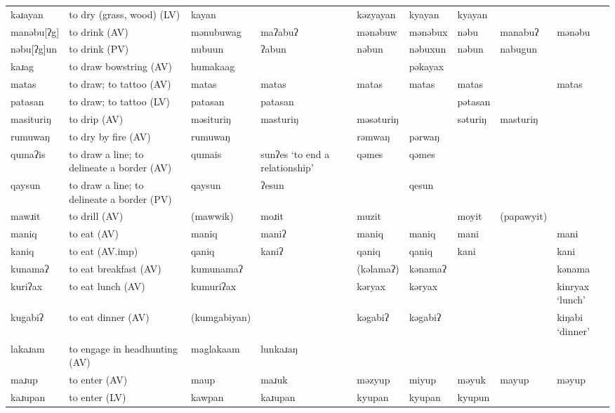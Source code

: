 \begin{landscape}
\begin{longtable}{*{9}{>{\raggedright\arraybackslash}p{}}}
\text{*}kəɹayan      & to dry (grass, wood) (LV) & kayan &  & kəzyayan & kyayan & kyayan &  & \\
\text{*}manəbu[ʔg]   & to drink (AV) & mənubuwag & maʔabuʔ & mənəbuw & mənəbux & nəbu & manabuʔ & mənəbu\\
\text{*}nəbu[ʔg]un   & to drink (PV) & nubuun & ʔabun & nəbun & nəbuxun & nəbun & nabugun & \\
\text{*}kaɹag       & to draw bowstring (AV) & humakaag &  &  & pəkayax &  &  & \\
\text{*}matas        & to draw; to tattoo (AV) & matas & matas & matas & matas & matas &  & matas\\
\text{*}patasan      & to draw; to tattoo (LV) & patasan & patasan &  &  & pətasan &  & \\
\text{*}masituriŋ    & to drip (AV) & məsituriŋ & masturiŋ & məsəturiŋ &  & səturiŋ & masturiŋ & \\
\text{*}rumuwaŋ      & to dry by fire (AV) & rumuwaŋ &  & rəmwaŋ & pərwaŋ &  &  & \\
\text{*}qumaʔis      & to draw a line; to delineate a border (AV) & qumais & sunʔes \newline `to end a relationship' & qəmes & qəmes &  &  & \\
\text{*}qaysun       & to draw a line; to delineate a border (PV) & qaysun & ʔesun &  & qesun &  &  & \\
\text{*}mawɹit       & to drill (AV) & (mawwik) & moɹit & muzit &  & moyit & (papawyit) & \\
\text{*}maniq        & to eat (AV) & maniq & maniʔ & maniq & maniq & mani &  & mani\\
\text{*}kaniq        & to eat (AV.imp) & qaniq & kaniʔ & qaniq & qaniq & kani &  & kani\\
\text{*}kunamaʔ      & to eat breakfast (AV) & kumunamaʔ &  & (kəlamaʔ) & kənamaʔ &  &  & kənama\\
\text{*}kuriʔax      & to eat lunch (AV) & kumuriʔax &  & kəryax & kəryax &  &  & kinryax `lunch'\\
\text{*}kugabiʔ      & to eat dinner (AV) & (kumgabiyan) &  & kəgabiʔ & kəgabiʔ &  &  & kiŋabi \newline `dinner'\\
\text{*}lakaɹam     & to engage in headhunting (AV) & maglakaam & lunkaɹaŋ &  &  &  &  & \\
\text{*}maɹup        & to enter (AV) & maup & maɹuk & məzyup & miyup & məyuk & mayup & məyup\\
\text{*}kaɹupan      & to enter (LV) & kawpan & kaɹupan & kyupan & kyupan & kyupun &  & \\

\end{longtable}
\end{landscape}
